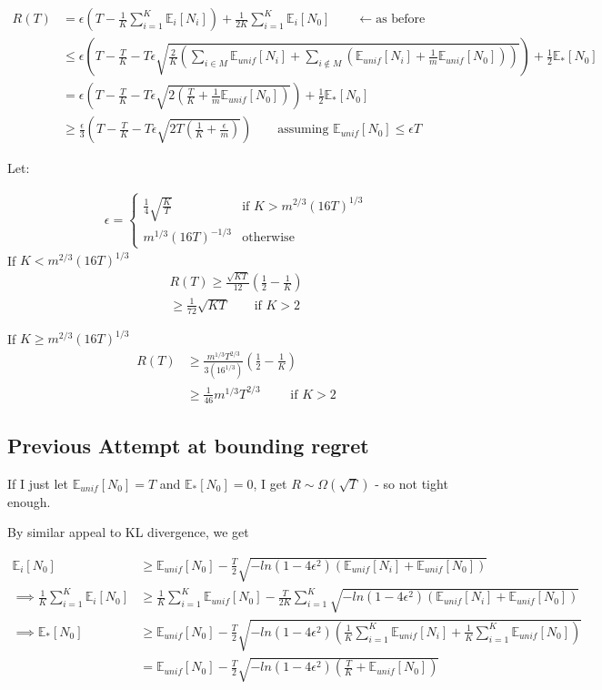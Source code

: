 \documentclass{article}
\newcommand{\E}{\mathbb E}
\newcommand{\eqn}[1]{\begin{align}#1\end{align}}
\newcommand{\bigomega}[1]{\Omega\left( #1 \right)}
\newcommand{\Ei}[1]{\E_i\left[ #1 \right]}
\newcommand{\Eu}[1]{\E_{unif}\left[ #1 \right]}
\newcommand{\Es}[1]{\E_{*}\left[ #1 \right]}
\theoremstyle{plain}
\theoremstyle{definition}
\begin{document}
\eqn {
R(T) &= \epsilon  \left(T -\frac{1}{K}\sum_{i=1}^K\Ei{N_i}\right) + \frac{1}{2K}\sum_{i=1}^K\Ei{N_0} \qquad \leftarrow \text{as before}\\
&\leq \epsilon \left(T - \frac{T}{K} - T\epsilon\sqrt{\frac{2}{K}\left(\sum_{i\in M}\Eu{N_i} + \sum_{i \notin M}(\Eu{N_i}+\frac{1}{m}\Eu{N_0})  \right)}   \right)+\frac{1}{2}\Es{N_0}\\
&= \epsilon \left(T - \frac{T}{K} - T\epsilon\sqrt{2\left(\frac{T}{K} + \frac{1}{m}\Eu{N_0}\right)}   \right)+\frac{1}{2}\Es{N_0}\\
&\geq \frac{\epsilon}{3} \left(T - \frac{T}{K} - T\epsilon\sqrt{2T\left(\frac{1}{K} + \frac{\epsilon}{m}\right)}   \right) \qquad \text{assuming } \Eu{N_0} \leq \epsilon T
}

Let:

\eqn{
\epsilon = \begin{cases}
\frac{1}{4}\sqrt{\frac{K}{T}} & \text{if } K > m^{2/3}(16T)^{1/3} \\
m^{1/3}(16T)^{-1/3} & \text{otherwise}
\end{cases}
}
If $K < m^{2/3}(16T)^{1/3}$
\eqn {
R(T) \geq \frac{\sqrt{KT}}{12}\left(\frac{1}{2} - \frac{1}{K}\right)\\
\geq \frac{1}{72}\sqrt{KT} \qquad \text{if } K > 2
}

If  $K \geq m^{2/3}(16T)^{1/3}$
\eqn{
R(T)& \geq \frac{m^{1/3}T^{2/3}}{3(16^{1/3})}\left(\frac{1}{2} - \frac{1}{K}\right) \\
& \geq \frac{1}{46}m^{1/3}T^{2/3} \qquad \text{ if } K > 2
}

\pagebreak
\subsection{Previous Attempt at bounding regret}

If I just let $\Eu{N_0} = T$ and $\Es{N_0} = 0$, I get $R \sim \bigomega{\sqrt{T}}$ - so not tight enough. 

By similar appeal to KL divergence, we get

\eqn {
\Ei{N_0} & \geq \Eu{N_0} - \frac{T}{2}\sqrt{-ln(1-4\epsilon^2)(\Eu{N_i}+\Eu{N_0})} \\
\implies \frac{1}{K}\sum_{i=1}^K\Ei{N_0} & \geq \frac{1}{K}\sum_{i=1}^K\Eu{N_0} - \frac{T}{2K}\sum_{i=1}^K\sqrt{-ln(1-4\epsilon^2)(\Eu{N_i}+\Eu{N_0})}\\
\implies \Es{N_0} & \geq \Eu{N_0} - \frac{T}{2}\sqrt{-ln(1-4\epsilon^2)(\frac{1}{K}\sum_{i=1}^K\Eu{N_i}+\frac{1}{K}\sum_{i=1}^K\Eu{N_0})}\\
 & = \Eu{N_0} - \frac{T}{2}\sqrt{-ln(1-4\epsilon^2)(\frac{T}{K}+\Eu{N_0})}
}
\end{document}

